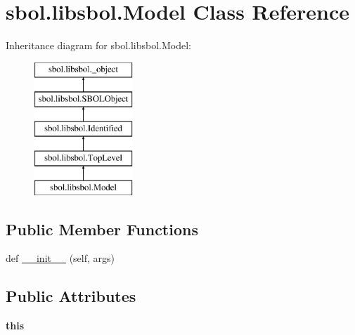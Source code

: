 \hypertarget{classsbol_1_1libsbol_1_1_model}{}\section{sbol.\+libsbol.\+Model Class Reference}
\label{classsbol_1_1libsbol_1_1_model}
Inheritance diagram for sbol.\+libsbol.\+Model\+:\begin{figure}[H]
\begin{center}
\leavevmode
\includegraphics[height=5.000000cm]{classsbol_1_1libsbol_1_1_model}
\end{center}
\end{figure}
\subsection*{Public Member Functions}
\begin{DoxyCompactItemize}
\item 
def \hyperlink{classsbol_1_1libsbol_1_1_model_a246cc573e9da6b1b2b2576885511fff7}{\+\_\+\+\_\+init\+\_\+\+\_\+} (self, args)
\end{DoxyCompactItemize}
\subsection*{Public Attributes}
\begin{DoxyCompactItemize}
\item 
{\bfseries this}\hypertarget{classsbol_1_1libsbol_1_1_model_adbc41a7ed052768e8bf574e6f10fdb1a}{}\label{classsbol_1_1libsbol_1_1_model_adbc41a7ed052768e8bf574e6f10fdb1a}

\end{DoxyCompactItemize}
